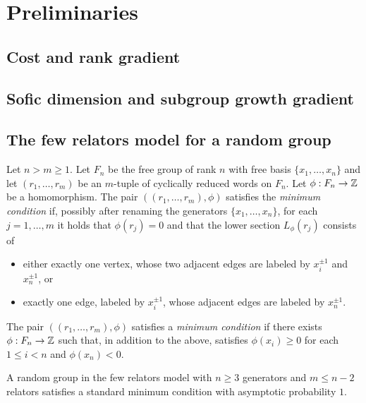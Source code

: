 \section{Preliminaries}\label{section: preliminaries}
\subsection{Cost and rank gradient}


\subsection{Sofic dimension and subgroup growth gradient}


\subsection{The few relators model for a random group}


\begin{defn} Let $n>m\ge 1$. Let $F_n$ be the free group of rank $n$ with free basis $\{x_1,\ldots,x_n\}$ and let $(r_1,\ldots, r_m)$ be an $m$-tuple of cyclically reduced words on $F_n$. Let $\phi:F_n\to \mathbb{Z}$ be a homomorphism. The pair $((r_1,\ldots, r_m),\phi)$ satisfies the \emph{minimum condition} if, possibly after renaming the generators $\{x_1,\ldots, x_n\}$, for each $j=1,\ldots,m$ it holds that $\phi(r_j)=0$ and that the lower section $L_{\phi}(r_j)$ consists of 
	\begin{itemize}
	\item either exactly one vertex, whose two adjacent edges are labeled by $x_i^{\pm 1}$ and $x_n^{\pm 1}$, or
	\item exactly one edge, labeled by $x_i^{\pm 1}$, whose adjacent edges are labeled by $x_n^{\pm 1}$.
	\end{itemize}
	The pair $((r_1,\ldots, r_m),\phi)$ satisfies a \emph{minimum condition} if there exists $\phi:F_n\to \mathbb{Z}$ such that, in addition to the above, satisfies $\phi(x_i)\ge 0$ for each $1\le i< n$ and $\phi(x_n)<0$.
\end{defn}


\begin{prop}
	A random group in the few relators model with $n\ge 3$ generators and $m\le n-2$ relators satisfies a standard minimum condition with asymptotic probability $1$.
\end{prop}